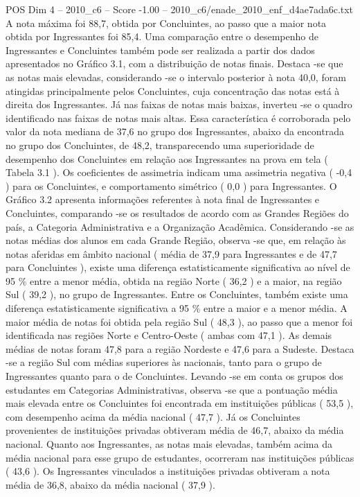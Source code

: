 \begin{textsample}{POS Dim 4 – 2010\_c6 – Score -1.00 – 2010\_c6/enade\_2010\_enf\_d4ae7ada6c.txt}
A nota máxima foi 88,7, obtida por Concluintes, ao passo que a maior nota obtida por Ingressantes foi 85,4.
Uma comparação entre o desempenho de Ingressantes e Concluintes também pode ser realizada a partir dos dados apresentados no Gráfico 3.1, com a distribuição de notas finais.
Destaca -se que as notas mais elevadas, considerando -se o intervalo posterior à nota 40,0, foram atingidas principalmente pelos Concluintes, cuja concentração das notas está à direita dos Ingressantes.
Já nas faixas de notas mais baixas, inverteu -se o quadro identificado nas faixas de notas mais altas.
Essa característica é corroborada pelo valor da nota mediana de 37,6 no grupo dos Ingressantes, abaixo da encontrada no grupo dos Concluintes, de 48,2, transparecendo uma superioridade de desempenho dos Concluintes em relação aos Ingressantes na prova em tela ( Tabela 3.1 ).
Os coeficientes de assimetria indicam uma assimetria negativa ( -0,4 ) para os Concluintes, e comportamento simétrico ( 0,0 ) para Ingressantes.
O Gráfico 3.2 apresenta informações referentes à nota final de Ingressantes e Concluintes, comparando -se os resultados de acordo com as Grandes Regiões do país, a Categoria Administrativa e a Organização Acadêmica.
Considerando -se as notas médias dos alunos em cada Grande Região, observa -se que, em relação às notas aferidas em âmbito nacional ( média de 37,9 para Ingressantes e de 47,7 para Concluintes ), existe uma diferença estatisticamente significativa ao nível de 95 \% entre a menor média, obtida na região Norte ( 36,2 ) e a maior, na região Sul ( 39,2 ), no grupo de Ingressantes.
Entre os Concluintes, também existe uma diferença estatisticamente significativa a 95 \% entre a maior e a menor média.
A maior média de notas foi obtida pela região Sul ( 48,3 ), ao passo que a menor foi identificada nas regiões Norte e Centro-Oeste ( ambas com 47,1 ).
As demais médias de notas foram 47,8 para a região Nordeste e 47,6 para a Sudeste.
Destaca -se a região Sul com médias superiores às nacionais, tanto para o grupo de Ingressantes quanto para o de Concluintes.
Levando -se em conta os grupos dos estudantes em Categorias Administrativas, observa -se que a pontuação média mais elevada entre os Concluintes foi encontrada em instituições públicas ( 53,5 ), com desempenho acima da média nacional ( 47,7 ).
Já os Concluintes provenientes de instituições privadas obtiveram média de 46,7, abaixo da média nacional.
Quanto aos Ingressantes, as notas mais elevadas, também acima da média nacional para esse grupo de estudantes, ocorreram nas instituições públicas ( 43,6 ).
Os Ingressantes vinculados a instituições privadas obtiveram a nota média de 36,8, abaixo da média nacional ( 37,9 ).

\end{textsample}
